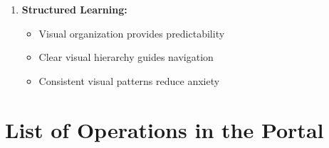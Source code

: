 \documentclass[12pt,a4paper]{article}
\begin{document}
\begin{enumerate}[leftmargin=*]
    \item \textbf{Structured Learning:}
    \begin{itemize}
        \item Visual organization provides predictability
        \item Clear visual hierarchy guides navigation
        \item Consistent visual patterns reduce anxiety
    \end{itemize}
\end{enumerate}

\newpage
\section{List of Operations in the Portal}

\renewcommand{\arraystretch}{1.6}
\end{document}

